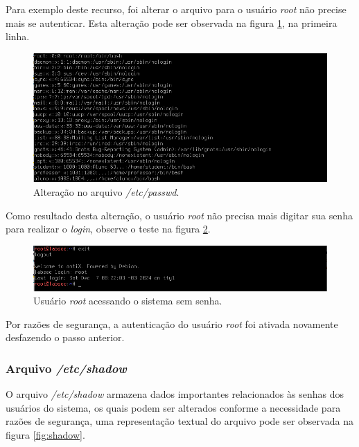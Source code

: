 \documentclass[
  12pt,				%
  oneside,   	        %
  a4paper,			%
  english,			%
  french,				%
  spanish,			%
  brazil,				%
  ]{pacotes/abntex2}
\begin{document}
Para exemplo deste recurso, foi alterar o arquivo para o usuário \textit{root} não precise mais se autenticar. Esta alteração pode ser observada na figura \ref{fig:passwd_root}, na primeira linha.
\begin{figure}[H]
  \centering
  \includegraphics[scale=0.7]{figuras/passwd_root.png}
  \caption{Alteração no arquivo \textit{/etc/passwd}.}
  \label{fig:passwd_root}
\end{figure}

Como resultado desta alteração, o usuário \textit{root} não precisa mais digitar sua senha para realizar o \textit{login}, observe o teste na figura \ref{fig:login_sem_senha}.

\begin{figure}[H]
  \centering
  \includegraphics[scale=0.7]{figuras/login_sem_senha.png}
  \caption{Usuário \textit{root} acessando o sistema sem senha.}
  \label{fig:login_sem_senha}
\end{figure}

Por razões de segurança, a autenticação do usuário \textit{root} foi ativada novamente desfazendo o passo anterior.

\subsubsection{Arquivo \textit{/etc/shadow}}
O arquivo \textit{/etc/shadow} armazena dados importantes relacionados às senhas dos usuários do sistema, os quais podem ser alterados conforme a necessidade para razões de segurança, uma representação textual do arquivo pode ser observada na figura \ref{fig:shadow}. 
\end{document}

